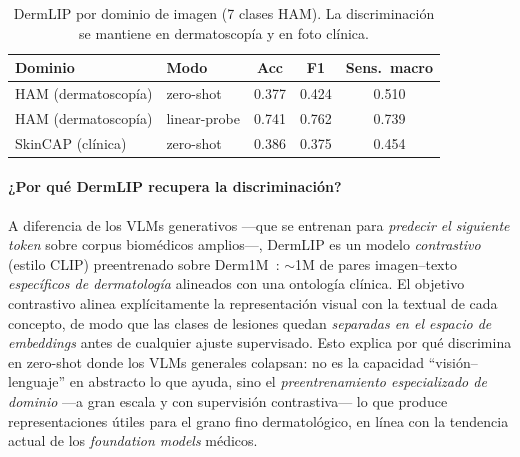 \documentclass[11pt, a4paper]{article}
\begin{document}
\begin{table}[H]
  \centering
  \caption{DermLIP por dominio de imagen (7 clases HAM). La discriminación se mantiene en dermatoscopía
  y en foto clínica.}
  \label{tab:dermlip_dominio}
  \begin{tabular}{llccc}
    \toprule
    \textbf{Dominio} & \textbf{Modo} & \textbf{Acc} & \textbf{F1} & \textbf{Sens.\ macro} \\
    \midrule
    HAM (dermatoscopía) & zero-shot    & 0.377 & 0.424 & 0.510 \\
    HAM (dermatoscopía) & linear-probe & 0.741 & 0.762 & 0.739 \\
    SkinCAP (clínica)   & zero-shot    & 0.386 & 0.375 & 0.454 \\
    \bottomrule
  \end{tabular}
\end{table}

\paragraph{¿Por qué DermLIP recupera la discriminación?} A diferencia de los VLMs generativos —que se
entrenan para \emph{predecir el siguiente token} sobre corpus biomédicos amplios—, DermLIP es un modelo
\emph{contrastivo} (estilo CLIP) preentrenado sobre Derm1M~\cite{yan2025derm1m}: $\sim$1M de pares
imagen--texto \emph{específicos de dermatología} alineados con una ontología clínica. El objetivo
contrastivo alinea explícitamente la representación visual con la textual de cada concepto, de modo que
las clases de lesiones quedan \emph{separadas en el espacio de embeddings} antes de cualquier ajuste
supervisado. Esto explica por qué discrimina en zero-shot donde los VLMs generales colapsan: no es la
capacidad ``visión--lenguaje'' en abstracto lo que ayuda, sino el \emph{preentrenamiento especializado de
dominio} —a gran escala y con supervisión contrastiva— lo que produce representaciones útiles para el
grano fino dermatológico, en línea con la tendencia actual de los \emph{foundation models} médicos.
\end{document}
